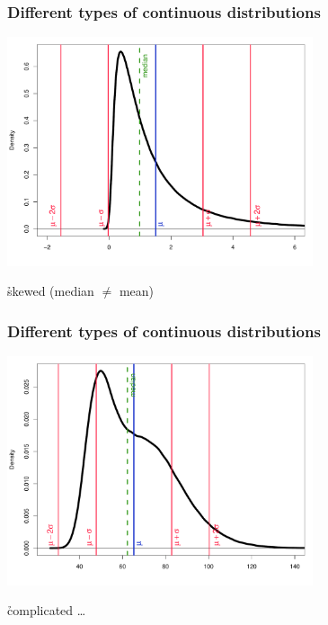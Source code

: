 \documentclass[t]{beamer} %
\begin{document}
\begin{frame}
  \frametitle{Different types of continuous distributions}
  
  \ungap[1]
  \begin{center}
    \includegraphics[width=9cm]{img/disttype_skewed}

    \ungap[1]
    \h{skewed} (median $\neq$ mean)
  \end{center}
\end{frame}

\begin{frame}
  \frametitle{Different types of continuous distributions}
  
  \ungap[1]
  \begin{center}
    \includegraphics[width=9cm]{img/disttype_complicated}

    \ungap[1]
    \h{complicated \ldots}
  \end{center}
\end{frame}
\end{document}
